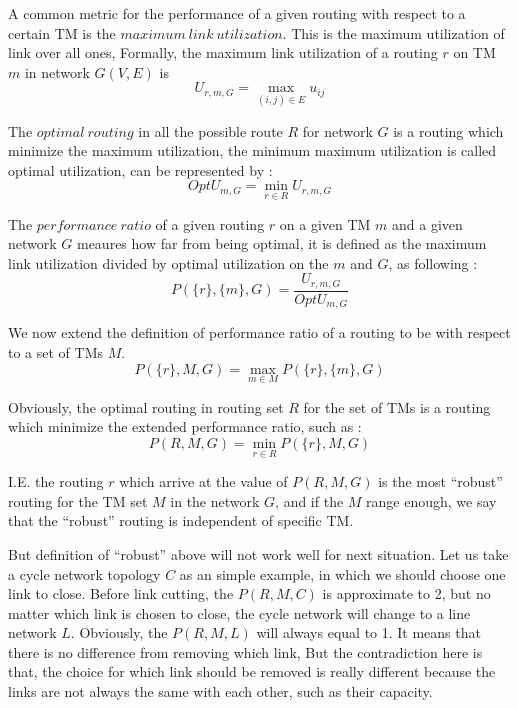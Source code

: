 \documentclass[conference]{IEEEtran}
\begin{document}
A common metric for the performance of a given routing with respect to a certain TM is the $maximum\ link\ utilization$.
This is the maximum utilization of link over all ones, Formally, the maximum link utilization of a routing $r$ on 
TM $m$ in network $G(V,E)$ is 
\begin{equation}
	U_{r, m, G} = \max_{(i,j)\in E} u_{ij}
\end{equation}

The $optimal\ routing$ in all the possible route $R$ for network $G$ is a routing which minimize the maximum utilization,
the minimum maximum utilization is called optimal utilization, can be represented by :
\begin{equation}
	OptU_{m, G} = \min_{r\in R} U_{r, m, G}
\end{equation}

The $performance\ ratio$ of a given routing $r$ on a given TM $m$ and a given network $G$ meaures how far from being 
optimal, it is defined as the maximum link utilization divided by optimal utilization on the $m$ and $G$, as following : 
\begin{equation}
	P(\{ r \},\{ m \}, G) = \frac{U_{r,m,G}}{OptU_{m,G}}
\end{equation}

We now extend the definition of performance ratio of a routing to be with respect to a set of TMs $M$. 
\begin{equation}
	P(\{ r \}, M, G) = \max_{m\in M} P(\{ r \}, \{ m \}, G)
\end{equation}

Obviously, the optimal routing in routing set $R$ for the set of TMs is a routing which minimize the extended 
performance ratio, such as :
\begin{equation}
	P(R, M, G) = \min_{r\in R} P(\{ r \}, M, G)
\end{equation}

I.E. the routing $r$ which arrive at the value of $P(R,M,G)$ is the most ``robust'' routing for the TM set $M$ 
in the network $G$, and if the $M$ range enough, we say that the ``robust'' routing is independent of specific TM.

But definition of ``robust'' above will not work well for next situation. Let us take a cycle network topology $C$ as 
an simple example, in which we should choose one link to close. Before link cutting, the $P(R, M, C)$ is 
approximate to 2, but no matter which link is chosen to close, the cycle network will change to a line network $L$. 
Obviously, the $P(R, M, L)$ will always equal to 1. It means that there is no difference from removing which link,
But the contradiction here is that, the choice for which link should be removed is really different because the 
links are not always the same with each other, such as their capacity.
\end{document}
